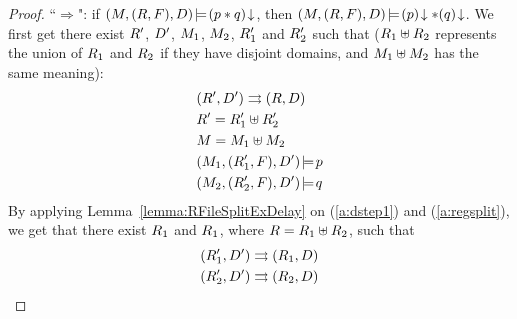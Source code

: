 \begin{proof}
	``$\Rightarrow$": 
	if ${(M, (R, F), D)}\!\models\!{{(p*q)}\!\downarrow}$, then 
	${(M, (R, F), D)}\!\models\!{{(p)}\!\downarrow*{(q)}\!\downarrow}$. 
	We first get there exist $R'$, $D'$, 
	$M_1$, $M_2$, $R_1'$ and $R_2'$ such that 
	($R_1 \uplus R_2$ represents the union of
	$R_1$ and $R_2$ if they have disjoint domains, and 
	$M_1 \uplus M_2$ has the same meaning):
	\begin{align}
		& {(R', D')}\rightrightarrows{(R, D)} \label{a:dstep1} \\
		& R' = R_1'\uplus R_2'
		\label{a:regsplit} \\
		& M = M_1\uplus M_2 
		\label{a:memsplit} \\
		& {(M_1, (R_1', F), D')}\!\models\!{p} 
		\label{a:pholds} \\
		& {(M_2, (R_2', F), D')}\!\models\!{q}
		\label{a:qholds} 
	\end{align}
	By applying Lemma~\ref{lemma:RFileSplitExDelay}
	on (\ref{a:dstep1}) and (\ref{a:regsplit}), we get 
	that there exist $R_1$ and $R_1$, 
	where $R = R_1\uplus R_2$, such that
	\begin{align}
		& {(R_1', D')}\rightrightarrows{(R_1, D)}
		\label{a:dstep-split1} \\
		& {(R_2', D')}\rightrightarrows{(R_2, D)}
		\label{a:dstep-split2}
	\end{align}
	

\end{proof}
